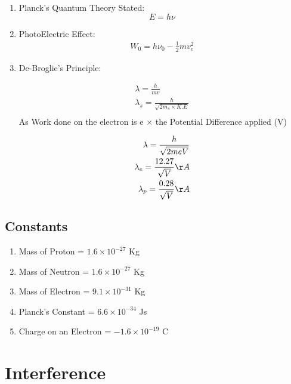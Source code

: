 \documentclass[12pt]{article}
\begin{document}
\begin{enumerate}
	\item Planck's Quantum Theory Stated: 
	\begin{equation}
		E = h\nu
	\end{equation}

	\item PhotoElectric Effect: 
	\begin{eqnarray}
		W_0 = h\nu_0 - \frac{1}{2}m v_e^2
	\end{eqnarray}

	\item De-Broglie's Principle:
	
	\begin{eqnarray}
		\lambda = \frac{h}{mv} \\
		\lambda_s = \frac{h}{\sqrt{2m_s\times K.E}}\\
	\end{eqnarray}
	As Work done on the electron is e $\times$ the Potential Difference applied (V)
	
	\begin{eqnarray}
		\lambda = \frac{h}{\sqrt{2meV}}\\
		\lambda_e = \frac{12.27}{\sqrt{V}}\AA \\
		\lambda_p = \frac{0.28}{\sqrt{V}} \AA
	\end{eqnarray}
	
	
\end{enumerate}


\subsection{Constants}


\begin{enumerate}
	\item Mass of Proton = $1.6 \times 10^{-27}$ Kg
	\item Mass of Neutron = $1.6 \times 10^{-27}$ Kg
	\item Mass of Electron = $9.1 \times 10^{-31}$ Kg
	\item Planck's Constant = $6.6 \times 10^{-34}$ Js
	\item Charge on an Electron  = $-1.6 \times 10^{-19}$ C
\end{enumerate}




\clearpage

\section{Interference}
%	
%	
%	
%	
%	
\end{document}
